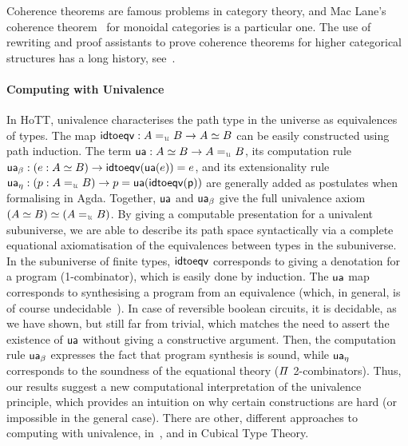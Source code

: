 Coherence theorems are famous problems in category theory, and Mac Lane's coherence
theorem~\cite{maclaneNaturalAssociativityCommutativity1963,joyalBraidedTensorCategories1993,gurskiInfiniteLoopSpaces2013}
for monoidal categories is a particular one. The use of rewriting and proof assistants to prove coherence theorems
for higher categorical structures has a long history, see~\cite*{forestCoherenceGrayCategories2018,beylinExtractingProofCoherence1996}.

\paragraph{Computing with Univalence} In HoTT, univalence characterises the path type in the universe as equivalences of
types. The map $\term{idtoeqv} : A \id_{\UU} B \to A \eqv B$ can be easily constructed using path induction. The term
$\term{ua} : A \eqv B \to A \id_{\UU} B$, its computation rule
$\term{ua_\beta} : (e : A \eqv B) \to \term{idtoeqv}(\term{ua}(e)) \id e$, and its extensionality rule
$\term{ua_\eta} : (p : A \id_{\UU} B) \to p \id \term{ua}(\term{idtoeqv(p)})$ are generally added as postulates when
formalising in Agda. Together, $\operatorname{\mathsf{ua}}$ and $\operatorname{\mathsf{ua}}_\beta$ give the full univalence axiom
$(A \eqv B) \eqv (A \id_{\UU} B)$.
By giving a computable presentation for a univalent subuniverse, we are able to describe its path space syntactically
via a complete equational axiomatisation of the equivalences between types in the subuniverse.
In the subuniverse of finite types, $\operatorname{\mathsf{idtoeqv}}$ corresponds to giving a denotation for a program (1-combinator),
which is easily done by induction. The $\operatorname{\mathsf{ua}}$ map corresponds to synthesising a program from an equivalence (which,
in general, is of course undecidable~\cite{krogmeierDecidableSynthesisPrograms2020}). In case of reversible boolean
circuits, it is decidable, as we have shown, but still far from trivial, which matches the need to assert the existence
of $\operatorname{\mathsf{ua}}$ without giving a constructive argument. Then, the computation rule $\operatorname{\mathsf{ua_\beta}}$ expresses the fact
that program synthesis is sound, while $\operatorname{\mathsf{ua_\eta}}$ corresponds to the soundness of the equational theory ($\mathit{\Pi}$
2-combinators). Thus, our results suggest a new computational interpretation of the univalence principle, which
provides an intuition on why certain constructions are hard (or impossible in the general case). There are other,
different approaches to computing with univalence,
in~\cite*{angiuliInternalizingRepresentationIndependence2021,tabareauMarriageUnivalenceParametricity2021}, and in
Cubical Type
Theory\cite*{angiuliComputationalSemanticsCartesianCubical2019,vezzosiCubicalAgdaDependently2019}.

